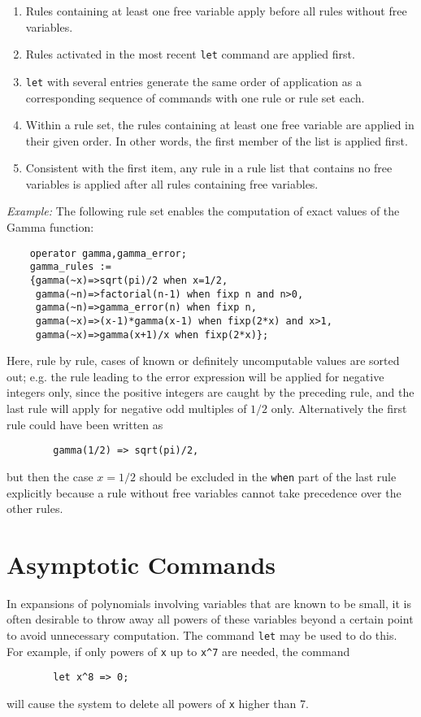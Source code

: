 \begin{enumerate}
\item Rules containing at least one free variable apply before all rules
without free variables.
\item Rules activated in the most recent \texttt{let}
command are applied first.
\item \texttt{let} with several entries generate
the same order of application as a corresponding sequence of commands with
one rule or rule set each.
\item Within a rule set, the rules containing at least
one free variable are applied in their given order.
In other words, the first member of the list is applied first.
\item Consistent with the first item, any rule in a rule list that
contains no free variables is applied after all rules containing free
variables.
\end{enumerate}
\textit{Example:} The following rule set enables the computation of exact
values of the Gamma function:
\begin{verbatim}
    operator gamma,gamma_error;
    gamma_rules :=
    {gamma(~x)=>sqrt(pi)/2 when x=1/2,
     gamma(~n)=>factorial(n-1) when fixp n and n>0,
     gamma(~n)=>gamma_error(n) when fixp n,
     gamma(~x)=>(x-1)*gamma(x-1) when fixp(2*x) and x>1,
     gamma(~x)=>gamma(x+1)/x when fixp(2*x)};
\end{verbatim}
Here, rule by rule, cases of known or definitely uncomputable values
are sorted out; e.g. the rule leading to the error expression
will be applied for negative integers only, since the positive
integers are caught by the preceding rule, and the
last rule will apply for negative odd multiples of $1/2$ only.
Alternatively the first rule could have been written as
\begin{verbatim}
        gamma(1/2) => sqrt(pi)/2,
\end{verbatim}
but then the case $x=1/2$ should be excluded in the \texttt{when} part of the
last rule explicitly because a rule without free variables cannot take
precedence over the other rules.

\section{Asymptotic Commands} 
\label{sec-asymp}
In expansions of polynomials involving variables that are known to be
small, it is often desirable to throw away all powers of these variables
beyond a certain point to avoid unnecessary computation.  The command
\texttt{let} may be used to do this.  For example, if only powers of \texttt{x} up to
\texttt{x\textasciicircum 7} are needed, the command
\begin{verbatim}
        let x^8 => 0;
\end{verbatim}
will cause the system to delete all powers of \texttt{x} higher than 7.


